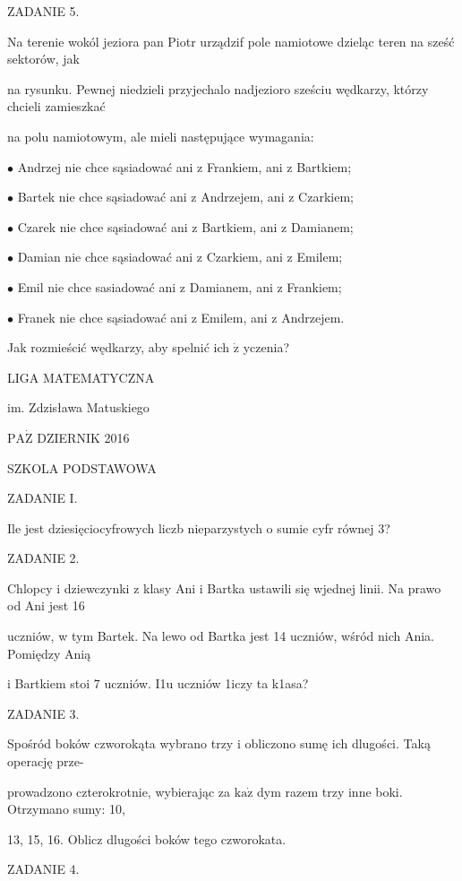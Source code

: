 \documentclass[a4paper,12pt]{article}
\begin{document}
ZADANIE 5.

Na terenie wokól jeziora pan Piotr urządzif pole namiotowe dzieląc teren na sześć sektorów, jak

na rysunku. Pewnej niedzieli przyjechalo nadjezioro sześciu wędkarzy, którzy chcieli zamieszkać

na polu namiotowym, ale mieli następujące wymagania:

$\bullet$ Andrzej nie chce sąsiadować ani z Frankiem, ani z Bartkiem;

$\bullet$ Bartek nie chce sąsiadować ani z Andrzejem, ani z Czarkiem;

$\bullet$ Czarek nie chce sąsiadować ani z Bartkiem, ani z Damianem;

$\bullet$ Damian nie chce sąsiadować ani z Czarkiem, ani z Emilem;

$\bullet$ Emil nie chce sasiadować ani z Damianem, ani z Frankiem;

$\bullet$ Franek nie chce sąsiadować ani z Emilem, ani z Andrzejem.

Jak rozmieścić wędkarzy, aby spelnić ich $\dot{\mathrm{z}}$ yczenia?






LIGA MATEMATYCZNA

im. Zdzisława Matuskiego

$\mathrm{P}\mathrm{A}\dot{\mathrm{Z}}$ DZIERNIK 2016

SZKOLA PODSTAWOWA

ZADANIE I.

Ile jest dziesięciocyfrowych liczb nieparzystych o sumie cyfr równej 3?

ZADANIE 2.

Chlopcy i dziewczynki z klasy Ani i Bartka ustawili się wjednej linii. Na prawo od Ani jest 16

uczniów, w tym Bartek. Na lewo od Bartka jest 14 uczniów, wśród nich Ania. Pomiędzy Anią

i Bartkiem stoi 7 uczniów. I1u uczniów 1iczy ta k1asa?

ZADANIE 3.

Spośród boków czworokąta wybrano trzy i obliczono sumę ich dlugości. Taką operację prze-

prowadzono czterokrotnie, wybierając za $\mathrm{k}\mathrm{a}\dot{\mathrm{z}}$ dym razem trzy inne boki. Otrzymano sumy: 10,

13, 15, 16. Oblicz dlugości boków tego czworokata.

ZADANIE 4.
\end{document}

